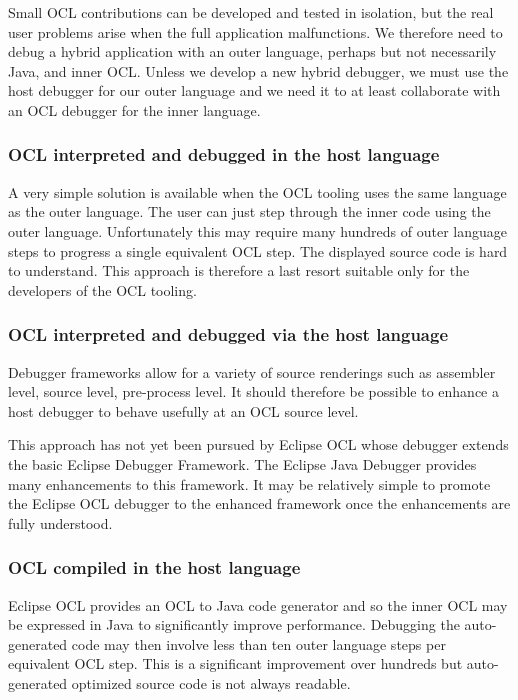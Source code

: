 \documentclass[a4paper]{article}
\begin{document}
Small OCL contributions can be developed and tested in isolation, but the real user problems arise when the full application malfunctions. We therefore need to debug a hybrid application with an outer language, perhaps but not necessarily Java, and inner OCL. Unless we develop a new hybrid debugger, we must use the host debugger for our outer language and we need it to at least collaborate with an OCL debugger for the inner language.

\subsubsection{OCL interpreted and debugged in the host language}

A very simple solution is available when the OCL tooling uses the same language as the outer language. The user can just step through the inner code using the outer language. Unfortunately this may require many hundreds of outer language steps to progress a single equivalent OCL step. The displayed source code is hard to understand. This approach is therefore a last resort suitable only for the developers of the OCL tooling.

\subsubsection{OCL interpreted and debugged via the host language}

Debugger frameworks allow for a variety of source renderings such as assembler level, source level, pre-process level. It should therefore be possible to enhance a host debugger to behave usefully at an OCL source level.

This approach has not yet been pursued by Eclipse OCL whose debugger extends the basic Eclipse Debugger Framework. The Eclipse Java Debugger provides many enhancements to this framework. It may be relatively simple to promote the Eclipse OCL debugger to the enhanced framework once the enhancements are fully understood. 

\subsubsection{OCL compiled in the host language}

Eclipse OCL provides an OCL to Java code generator and so the inner OCL may be expressed in Java to significantly improve performance. Debugging the auto-generated code may then involve less than ten outer language steps per equivalent OCL step. This is a significant improvement over hundreds but auto-generated optimized source code is not always readable.
\end{document}
